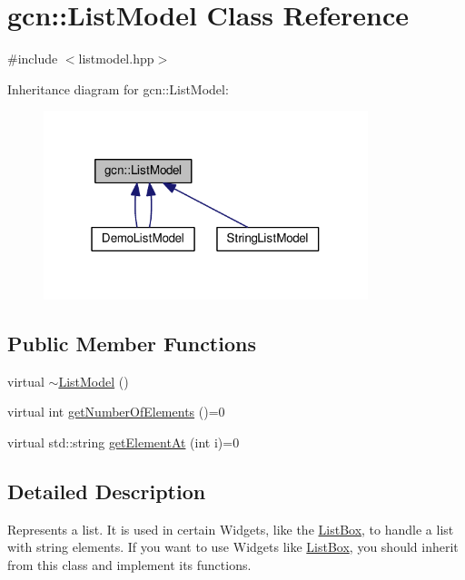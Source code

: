 \hypertarget{classgcn_1_1ListModel}{}\section{gcn\+:\+:List\+Model Class Reference}
\label{classgcn_1_1ListModel}


{\ttfamily \#include $<$listmodel.\+hpp$>$}



Inheritance diagram for gcn\+:\+:List\+Model\+:\nopagebreak
\begin{figure}[H]
\begin{center}
\leavevmode
\includegraphics[width=268pt]{classgcn_1_1ListModel__inherit__graph}
\end{center}
\end{figure}
\subsection*{Public Member Functions}
\begin{DoxyCompactItemize}
\item 
virtual \hyperlink{classgcn_1_1ListModel_a2f18ef154cae00725dc593cc6e8175d2}{$\sim$\+List\+Model} ()
\item 
virtual int \hyperlink{classgcn_1_1ListModel_afc92c70252b9888f22b0164bc28f452c}{get\+Number\+Of\+Elements} ()=0
\item 
virtual std\+::string \hyperlink{classgcn_1_1ListModel_a60c9432c539666c3e2ac6a2bee91e87f}{get\+Element\+At} (int i)=0
\end{DoxyCompactItemize}


\subsection{Detailed Description}
Represents a list. It is used in certain Widgets, like the \hyperlink{classgcn_1_1ListBox}{List\+Box}, to handle a list with string elements. If you want to use Widgets like \hyperlink{classgcn_1_1ListBox}{List\+Box}, you should inherit from this class and implement it\textquotesingle{}s functions. 

